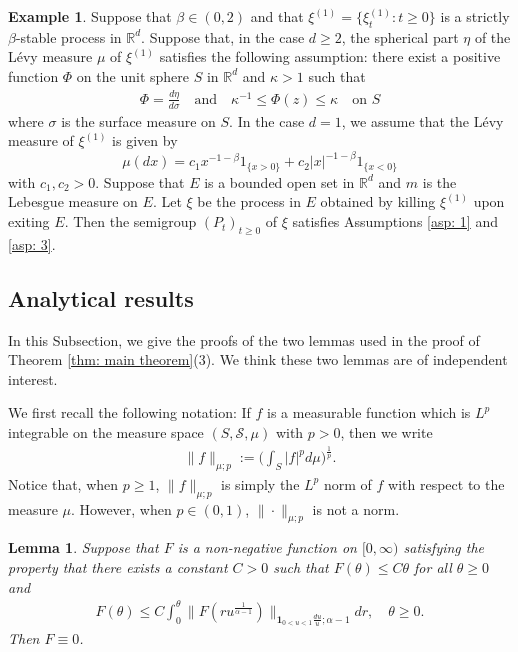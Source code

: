 \documentclass[12pt,a4paper]{amsart}
\newtheorem{lem}[thm]{Lemma}
\theoremstyle{definition}
\newtheorem{exa}[thm]{Example}
\numberwithin{equation}{section}
\begin{document}
\begin{exa}
  Suppose that $\beta\in (0, 2)$ and that $\xi^{(1)}=\{\xi^{(1)}_t: t\ge0\}$ is a strictly $\beta$-stable process in $\mathbb{R}^d$. 
  Suppose that, in the case $d\ge 2$, the spherical part $\eta$ of the L\'evy measure $\mu$ of $\xi^{(1)}$ satisfies the following assumption: 
  there exist a positive function $\Phi$ on the unit sphere $S$ in $\mathbb{R}^d$ and $\kappa>1$
such that
\begin{align}
  \Phi=\frac{d\eta}{d\sigma} \quad \text{and} \quad
  \kappa^{-1}\le \Phi(z)\le \kappa \quad \text{on } S
\end{align}
where $\sigma$ is the surface measure on $S$. In the case $d=1$, we assume that the L\'evy
measure of $\xi^{(1)}$ is given by
$$
\mu(dx)=c_1x^{-1-\beta}1_{\{x>0\}}+ c_2|x|^{-1-\beta}1_{\{x<0\}}
$$
with $c_1, c_2>0$. Suppose that $E$ is a bounded open set in $\mathbb{R}^d$
and $m$ is the Lebesgue measure on $E$.
Let $\xi$ be the process in $E$ obtained by killing $\xi^{(1)}$ upon exiting $E$.
Then the semigroup $(P_t)_{t\ge 0}$ of $\xi$ satisfies
Assumptions \ref{asp: 1} and \ref{asp: 3}.
\end{exa}


\subsection{Analytical results}
\label{sec: Characterizing the Zolotarev's distribution using an non-linear delay equation}
In this Subsection, we give the proofs of the two lemmas used in the proof of Theorem \ref{thm: main theorem}(3). We think these two lemmas are of independent interest.

We first recall the following notation:
If $f$ is a measurable function which is $L^p$ integrable on the measure space $(S,\mathscr S,\mu)$ with $p > 0$, then we write
\begin{align}
	\|f\|_{\mu;p}
	:= \Big(\int_{S} |f|^p d\mu \Big)^{\frac{1}{p}}.
\end{align}
Notice that, when $p\geq 1$, $\|f\|_{\mu;p}$ is simply the $L^p$ norm of $f$ with respect to the measure $\mu$.	
However, when $p \in (0,1)$, $\|\cdot\|_{\mu; p}$ is not a norm.

\begin{lem}\label{lem: F is zero}
	Suppose that $F$ is a non-negative function on $[0,\infty)$ satisfying the property that there exists a constant $C>0$ such that  $F(\theta) \leq C\theta$ for all $\theta \geq 0$ and
  \begin{align}
    \label{eq:Gronwall_inequlity}
    F(\theta)
    \leq C \int_0^\theta \|  F(ru^{ \frac{1}{\alpha - 1}  })\|_{\mathbf 1_{0<u<1}\frac{du}{u}; \alpha - 1} dr, \quad \theta \geq 0.
  \end{align}
	Then $F \equiv 0$.
\end{lem}
\end{document}
